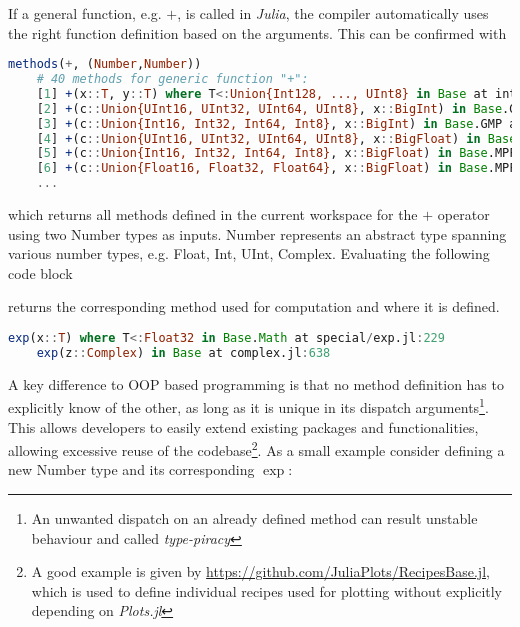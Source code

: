 If a general function, e.g. $+$, is called in \textit{Julia}, the compiler automatically uses the right function definition based on the arguments. 
This can be confirmed with


\begin{lstlisting}[language=Julia]
    methods(+, (Number,Number))
    # 40 methods for generic function "+":
    [1] +(x::T, y::T) where T<:Union{Int128, ..., UInt8} in Base at int.jl:87
    [2] +(c::Union{UInt16, UInt32, UInt64, UInt8}, x::BigInt) in Base.GMP at gmp.jl:528
    [3] +(c::Union{Int16, Int32, Int64, Int8}, x::BigInt) in Base.GMP at gmp.jl:534
    [4] +(c::Union{UInt16, UInt32, UInt64, UInt8}, x::BigFloat) in Base.MPFR at mpfr.jl:376
    [5] +(c::Union{Int16, Int32, Int64, Int8}, x::BigFloat) in Base.MPFR at mpfr.jl:384
    [6] +(c::Union{Float16, Float32, Float64}, x::BigFloat) in Base.MPFR at mpfr.jl:392
    ... 
\end{lstlisting}

which returns all methods defined in the current workspace for the $+$ operator using two Number types as inputs. Number represents an abstract type spanning various number types, e.g. Float, Int, UInt, Complex. 
Evaluating the following code block 



returns the corresponding method used for computation and where it is defined.

\begin{lstlisting}[language=Julia]
    exp(x::T) where T<:Float32 in Base.Math at special/exp.jl:229
    exp(z::Complex) in Base at complex.jl:638
\end{lstlisting}

A key difference to OOP based programming is that no method definition has to explicitly know of the other, as long as it is unique in its dispatch arguments\footnote{An unwanted dispatch on an already defined method can result unstable behaviour and called \textit{type-piracy}}.
This allows developers to easily extend existing packages and functionalities, allowing excessive reuse of the codebase\footnote{A good example is given by \url{https://github.com/JuliaPlots/RecipesBase.jl}, which is used to define individual recipes used for plotting without explicitly depending on \textit{Plots.jl}}. 
As a small example consider defining a new Number type and its corresponding $\exp$:



